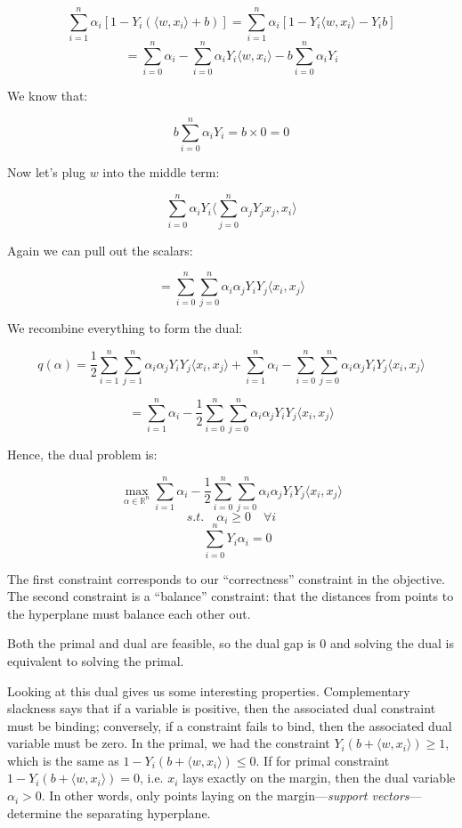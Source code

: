 \documentclass{minimal}
\begin{document}
$$
\sum_{i=1}^n \alpha_i [1 - Y_i(\langle w, x_i \rangle + b)] = \sum_{i=1}^n
\alpha_i [1 - Y_i \langle w, x_i \rangle - Y_i b]
$$
$$
= \sum_{i=0}^n \alpha_i - \sum_{i=0}^n \alpha_i Y_i \langle w, x_i \rangle -
b \sum_{i=0}^n \alpha_i Y_i
$$

We know that:

$$
b \sum_{i=0}^n \alpha_i Y_i = b \times 0 = 0
$$

Now let's plug $w$ into the middle term:

$$
\sum_{i=0}^n \alpha_i Y_i \langle \sum_{j=0}^n \alpha_j Y_j x_j, x_i \rangle
$$

Again we can pull out the scalars:

$$
= \sum_{i=0}^n \sum_{j=0}^n \alpha_i \alpha_j Y_i Y_j \langle x_i, x_j \rangle
$$

We recombine everything to form the dual:

$$
q(\alpha) = \frac{1}{2} \sum_{i=1}^n \sum_{j=1}^n \alpha_i \alpha_j Y_i Y_j
\langle x_i, x_j \rangle + \sum_{i=1}^n \alpha_i - 
\sum_{i=0}^n \sum_{j=0}^n \alpha_i \alpha_j Y_i Y_j \langle x_i, x_j \rangle
$$

$$
= \sum_{i=1}^n \alpha_i - \frac{1}{2} \sum_{i=0}^n \sum_{j=0}^n \alpha_i \alpha_j Y_i Y_j \langle x_i, x_j \rangle
$$

Hence, the dual problem is:

$$
\max_{\alpha \in \mathbb{R}^n} 
\sum_{i=1}^n \alpha_i - \frac{1}{2} \sum_{i=0}^n \sum_{j=0}^n \alpha_i \alpha_j Y_i Y_j \langle x_i, x_j \rangle
$$
$$
s.t. \quad \alpha_i \geq 0 \quad \forall i
$$
$$
\quad \sum_{i=0}^n Y_i \alpha_i = 0
$$

The first constraint corresponds to our ``correctness'' constraint in the
objective. The second constraint is a ``balance'' constraint: that the distances
from points to the hyperplane must balance each other out.

Both the primal and dual are feasible, so the dual gap is 0 and solving the dual is
equivalent to solving the primal. 

Looking at this dual gives us some interesting properties. Complementary slackness 
says that if a variable is positive,
then the associated dual constraint must be binding; conversely, if a constraint
fails to bind, then the associated dual variable must be zero. In the primal, we
had the constraint $Y_i(b + \langle w, x_i \rangle)\geq 1$, which is the same as
$1 - Y_i(b + \langle w, x_i \rangle) \leq 0$. If for primal constraint $1 - Y_i(b + \langle w, x_i
\rangle) = 0$, i.e. $x_i$ lays exactly on the margin, then the dual variable
$\alpha_i > 0$. In other words, only points laying on the
margin---\textit{support vectors}---determine the
separating hyperplane. 
\end{document}
